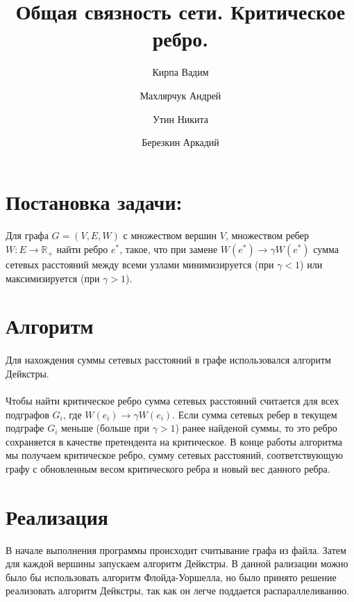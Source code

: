 \documentclass[12pt]{article}
\begin{document}
\title{Общая связность сети. Критическое ребро.}

\author{
  Кирпа Вадим
  \and
  Махлярчук Андрей
  \and
  Утин Никита
  \and
  Березкин Аркадий
}

\maketitle
\thispagestyle{empty}
\newpage

\section{Постановка задачи:}

\paragraph{}
Для графа $G = (V, E, W)$ с множеством вершин $V$,
множеством ребер $W: E \rightarrow \mathbb{R}_+$
найти ребро $e^*$, такое, что при замене
$W(e^*) \rightarrow \gamma W(e^*)$ сумма сетевых 
расстояний между всеми узлами минимизируется
(при $\gamma < 1$) или максимизируется (при $\gamma > 1$).

\section{Алгоритм}

\paragraph{}
Для нахождения суммы сетевых расстояний в графе использовался
алгоритм Дейкстры\cite{dijkstra}.

\paragraph{}
Чтобы найти критическое ребро сумма сетевых расстояний считается
для всех подграфов $G_i$, где $W(e_i) \rightarrow \gamma W(e_i)$. Если сумма сетевых
ребер в текущем подграфе $G_i$ меньше (больше при $\gamma > 1$)
ранее найденой суммы, то это ребро сохраняется в качестве претендента
на критическое. В конце работы алгоритма мы получаем критическое ребро, 
сумму сетевых расстояний, соответствующую графу с обновленным весом критического ребра и новый вес данного ребра.

\section{Реализация} 
В начале выполнения программы происходит считывание графа из файла. 
Затем для каждой вершины запускаем алгоритм Дейкстры. В данной рализации можно было бы использовать 
алгоритм Флойда-Уоршелла, но было принято решение реализовать алгоритм Дейкстры, так как он легче поддается распараллеливанию.
\end{document}
